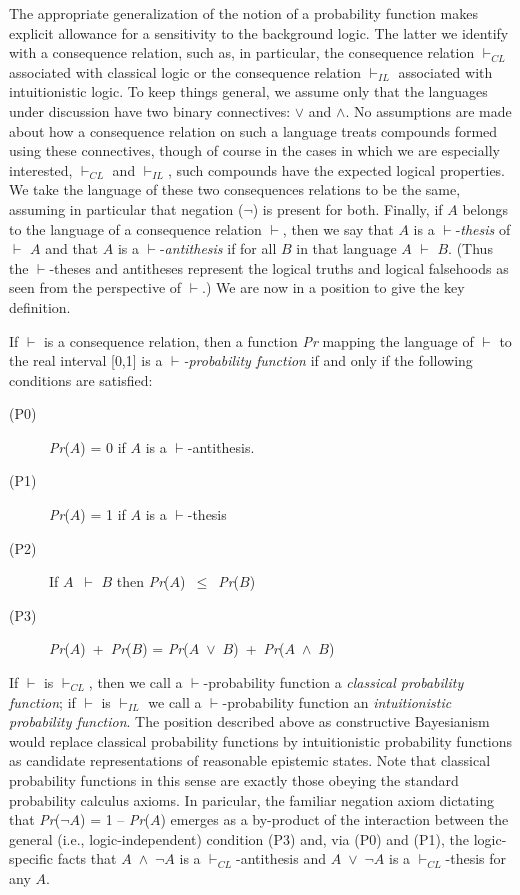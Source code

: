 \documentclass[
  11pt,
  letterpaper,
  DIV=11,
  numbers=noendperiod,
  oneside]{scrartcl}
\begin{document}
The appropriate generalization of the notion of a probability function
makes explicit allowance for a sensitivity to the background logic. The
latter we identify with a consequence relation, such as, in particular,
the consequence relation \(\vdash_{CL}\) associated with classical logic
or the consequence relation \(\vdash_{IL}\) associated with
intuitionistic logic. To keep things general, we assume only that the
languages under discussion have two binary connectives: \({\vee}\) and
\({\wedge}\). No assumptions are made about how a consequence relation
on such a language treats compounds formed using these connectives,
though of course in the cases in which we are especially interested,
\(\vdash_{CL}\) and \(\vdash_{IL}\), such compounds have the expected
logical properties. We take the language of these two consequences
relations to be the same, assuming in particular that negation
(\({\lnot}\)) is present for both. Finally, if \(A\) belongs to the
language of a consequence relation \(\vdash\), then we say that \(A\) is
a \(\vdash\)-\emph{thesis} of \(\vdash\) \(A\) and that \(A\) is a
\(\vdash\)-\emph{antithesis} if for all \(B\) in that language \(A\)
\(\vdash\) \(B\). (Thus the \(\vdash\)-theses and antitheses represent
the logical truths and logical falsehoods as seen from the perspective
of \(\vdash\).) We are now in a position to give the key definition.

If \(\vdash\) is a consequence relation, then a function \emph{Pr}
mapping the language of \(\vdash\) to the real interval {[}0,1{]} is a
\(\vdash\)\emph{-probability function} if and only if the following
conditions are satisfied:

\begin{description}
\item[(P0)]
\emph{Pr}(\(A\)) = 0 if \(A\) is a \(\vdash\)-antithesis.
\item[(P1)]
\emph{Pr}(\(A\)) = 1 if \(A\) is a \(\vdash\)-thesis
\item[(P2)]
If \(A\)~\(\vdash\) \(B\) then
\emph{Pr}(\(A\))~\({\leq}\)~\emph{Pr}(\(B\))
\item[(P3)]
\emph{Pr}(\(A\))~+~\emph{Pr}(\(B\)) =
\emph{Pr}(\(A\)~\({\vee}\)~\(B\))~+~\emph{Pr}(\(A\)~\({\wedge}\)~\(B\))
\end{description}

If \(\vdash\) is \(\vdash_{CL}\), then we call a \(\vdash\)-probability
function a \emph{classical probability function}; if \(\vdash\) is
\(\vdash_{IL}\) we call a \(\vdash\)-probability function an
\emph{intuitionistic} \emph{probability function}. The position
described above as constructive Bayesianism would replace classical
probability functions by intuitionistic probability functions as
candidate representations of reasonable epistemic states. Note that
classical probability functions in this sense are exactly those obeying
the standard probability calculus axioms. In paricular, the familiar
negation axiom dictating that \emph{Pr}(\({\lnot}\)\(A\)) = 1 --
\emph{Pr}(\(A\)) emerges as a by-product of the interaction between the
general (i.e., logic-independent) condition (P3) and, via (P0) and (P1),
the logic-specific facts that \(A\)~\({\wedge}\)~\({\lnot}\)\(A\) is a
\(\vdash_{CL}\)-antithesis and \(A\)~\({\vee}\)~\({\lnot}\)\(A\) is a
\(\vdash_{CL}\)-thesis for any \(A\).
\end{document}
